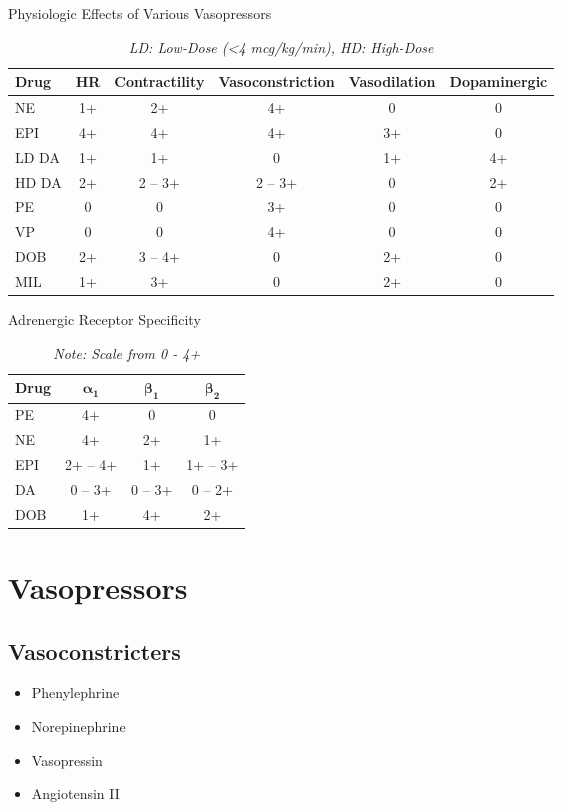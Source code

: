 \documentclass[main.tex]{subfiles}
\begin{document}
\begin{table}
	\centering
	\caption{Physiologic Effects of Various Vasopressors \autocite{hollenbergVasoactiveDrugsCirculatory2011a}}
	\begin{tabular}{lccccc}
		\textbf{Drug} & \textbf{HR} & \textbf{Contractility} & \textbf{Vasoconstriction} & \textbf{Vasodilation} & \textbf{Dopaminergic} \\ \hline
		NE & 1+ & 2+ & 4+ & 0 & 0 \\
		EPI & 4+ & 4+ & 4+ & 3+ & 0 \\
		LD DA & 1+ & 1+ & 0 & 1+ & 4+ \\
		HD DA & 2+ & 2 -- 3+ & 2 -- 3+ & 0 & 2+ \\
		PE & 0 & 0 & 3+ & 0 & 0 \\
		VP & 0 & 0 & 4+ & 0 & 0 \\
		DOB & 2+ & 3 -- 4+ & 0 & 2+ & 0 \\
		MIL & 1+ & 3+ & 0 & 2+ & 0
	\end{tabular}
	\caption*{\small \itshape LD: Low-Dose (\textless 4 mcg/kg/min), HD: High-Dose }
\end{table}


\begin{table}[h]
\centering
\caption{Adrenergic Receptor Specificity \autocite{jentzerPharmacotherapyUpdateUse2015b}}
\label{tab:adrenergic-receptor-specificity}
\begin{tabular}{l c c c}
	\textbf{Drug} & $\mathbf{\alpha_1}$ & $\mathbf{\beta_1}$ & $\mathbf{\beta_2}$\\ \hline
	PE & 4+ & 0 & 0 \\
	NE & 4+ & 2+ & 1+ \\
	EPI & 2+ -- 4+ & 1+ & 1+ -- 3+ \\
	DA & 0 -- 3+ & 0 -- 3+ & 0 -- 2+ \\
	DOB & 1+ & 4+ & 2+ \\
\end{tabular}
\caption*{\small \textit{Note: Scale from 0 - 4+}}
\end{table}


\section{Vasopressors}
\subsection{Vasoconstricters}
\begin{itemize}[noitemsep]
	\item Phenylephrine
	\item Norepinephrine
	\item Vasopressin
	\item Angiotensin II
\end{itemize}
\end{document}
